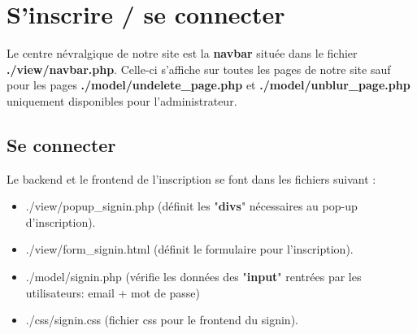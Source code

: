 \documentclass{article}
\begin{document}
\section{S'inscrire / se connecter}
Le centre névralgique de notre site est la \textbf{navbar} située dans le fichier \textbf{./view/navbar.php}. Celle-ci s'affiche sur toutes les pages de notre site sauf pour les pages \textbf{./model/undelete\_page.php} et \textbf{./model/unblur\_page.php} uniquement disponibles pour l'administrateur.
\subsection{Se connecter}
Le backend et le frontend de l'inscription se font dans les fichiers suivant :
\begin{itemize}
\item ./view/popup\_signin.php (définit les "\textbf{divs}" nécessaires au pop-up d'inscription).
\item ./view/form\_signin.html (définit le formulaire pour l'inscription).
\item ./model/signin.php (vérifie les données des "\textbf{input}" rentrées par les utilisateurs: email + mot de passe) 
\item ./css/signin.css (fichier css pour le frontend du signin).
\end{itemize}
\end{document}
